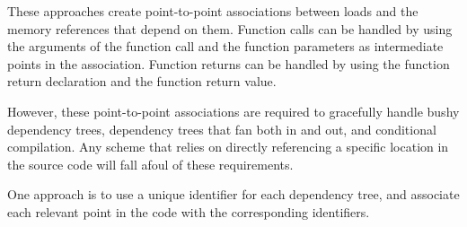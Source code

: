 These approaches create point-to-point associations between
 loads and the memory references that depend
on them.
Function calls can be handled by using the arguments of the function
call and the function parameters as intermediate points in the
association.
Function returns can be handled by using the function return
declaration and the function return value.

However, these point-to-point associations are required to gracefully handle
bushy dependency trees, dependency trees that fan both in and out,
and conditional compilation.
Any scheme that relies on directly referencing a specific location
in the source code will fall afoul of these requirements.

One approach is to use a unique identifier for each dependency tree,
and associate each relevant point in the code with the corresponding
identifiers.
